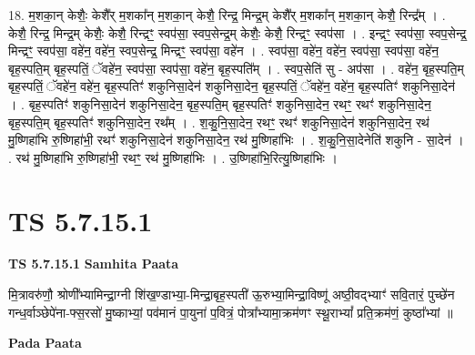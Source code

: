\documentclass[17pt]{extarticle}
\begin{document}
18. म॒शका॒न् केशैः॒ केशै᳚र् म॒शका᳚न् म॒शका॒न् केशै॒ रिन्द्र॒ मिन्द्र॒म् केशै᳚र् म॒शका᳚न् म॒शका॒न् केशै॒ रिन्द्र᳚म् । . केशै॒ रिन्द्र॒ मिन्द्र॒म् केशैः॒ केशै॒ रिन्द्रꣳ॒॒ स्वप॑सा॒ स्वप॒सेन्द्र॒म् केशैः॒ केशै॒ रिन्द्रꣳ॒॒ स्वप॑सा । . इन्द्रꣳ॒॒ स्वप॑सा॒ स्वप॒सेन्द्र॒ मिन्द्रꣳ॒॒ स्वप॑सा॒ वहे॑न॒ वहे॑न॒ स्वप॒सेन्द्र॒ मिन्द्रꣳ॒॒ स्वप॑सा॒ वहे॑न । . स्वप॑सा॒ वहे॑न॒ वहे॑न॒ स्वप॑सा॒ स्वप॑सा॒ वहे॑न॒ बृह॒स्पति॒म् बृह॒स्पतिं॒ ॅवहे॑न॒ स्वप॑सा॒ स्वप॑सा॒ वहे॑न॒ बृह॒स्पति᳚म् । . स्वप॒सेति॑ सु - अप॑सा । . वहे॑न॒ बृह॒स्पति॒म् बृह॒स्पतिं॒ ॅवहे॑न॒ वहे॑न॒ बृह॒स्पतिꣳ॑ शकुनिसा॒देन॑ शकुनिसा॒देन॒ बृह॒स्पतिं॒ ॅवहे॑न॒ वहे॑न॒ बृह॒स्पतिꣳ॑ शकुनिसा॒देन॑ । . बृह॒स्पतिꣳ॑ शकुनिसा॒देन॑ शकुनिसा॒देन॒ बृह॒स्पति॒म् बृह॒स्पतिꣳ॑ शकुनिसा॒देन॒ रथꣳ॒॒ रथꣳ॑ शकुनिसा॒देन॒ बृह॒स्पति॒म् बृह॒स्पतिꣳ॑ शकुनिसा॒देन॒ रथ᳚म् । . श॒कु॒नि॒सा॒देन॒ रथꣳ॒॒ रथꣳ॑ शकुनिसा॒देन॑ शकुनिसा॒देन॒ रथ॑ मु॒ष्णिहा॑भि रु॒ष्णिहा॑भी॒ रथꣳ॑ शकुनिसा॒देन॑ शकुनिसा॒देन॒ रथ॑ मु॒ष्णिहा॑भिः । . श॒कु॒नि॒सा॒देनेति॑ शकुनि - सा॒देन॑ । . रथ॑ मु॒ष्णिहा॑भि रु॒ष्णिहा॑भी॒ रथꣳ॒॒ रथ॑ मु॒ष्णिहा॑भिः । . उ॒ष्णिहा॑भि॒रित्यु॒ष्णिहा॑भिः । \newline
\pagebreak
{}

\section{ TS 5.7.15.1 }

\textbf{TS 5.7.15.1 } \newline
\textbf{Samhita Paata} \newline

मि॒त्रावरु॑णौ॒ श्रोणी᳚भ्यामिन्द्रा॒ग्नी शि॑ख॒ण्डाभ्या॒-मिन्द्रा॒बृह॒स्पती॑ ऊ॒रुभ्या॒मिन्द्रा॒विष्णू॑ अष्ठी॒वद्भ्याꣳ॑ सवि॒तारं॒ पुच्छे॑न गन्ध॒र्वाञ्छेपे॑ना-फ्स॒रसो॑ मु॒ष्काभ्यां॒ पव॑मानं पा॒युना॑ प॒वित्रं॒ पोत्रा᳚भ्यामा॒क्रम॑णꣳ स्थू॒राभ्यां᳚ प्रति॒क्रम॑णं॒ कुष्ठा᳚भ्यां ॥ \newline

\textbf{Pada Paata} \newline
\end{document}
